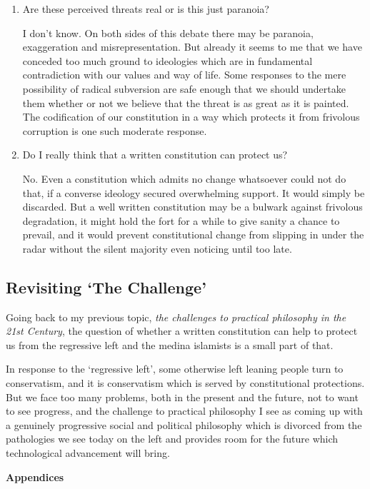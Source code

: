 \documentclass[14pt,titlepage]{extarticle}
\begin{document}
\begin{enumerate}
\item Are these perceived threats real or is this just paranoia?

  I don't know.
  On both sides of this debate there may be paranoia, exaggeration and misrepresentation.
  But already it seems to me that we have conceded too much ground to ideologies which are in fundamental contradiction with our values and way of life.
  Some responses to the mere possibility of radical subversion are safe enough that we should undertake them whether or not we believe that the threat is as great as it is painted.
  The codification of our constitution in a way which protects it from frivolous corruption is one such moderate response.

\item Do I really think that a written constitution can protect us?

  No.
  Even a constitution which admits no change whatsoever could not do that, if a converse ideology secured overwhelming support.
  It would simply be discarded.
  But a well written constitution may be a bulwark against frivolous degradation, it might hold the fort for a while to give sanity a chance to prevail, and it would prevent constitutional change from slipping in under the radar without the silent majority even noticing until too late.
\end{enumerate}

\subsection{Revisiting `The Challenge'}

Going back to my previous topic, {\it the challenges to practical philosophy in the 21st Century}, the question of whether a written constitution can help to protect us from the regressive left and the medina islamists is a small part of that.

In response to the `regressive left', some otherwise left leaning people turn to conservatism, and it is conservatism which is served by constitutional protections.
But we face too many problems, both in the present and the future, not to want to see progress, and the challenge to practical philosophy I see as coming up with a genuinely progressive social and political philosophy which is divorced from the pathologies we see today on the left and provides room for the future which technological advancement will bring.

\pagebreak
{\bf \Large Appendices}
\appendix
\end{document}
